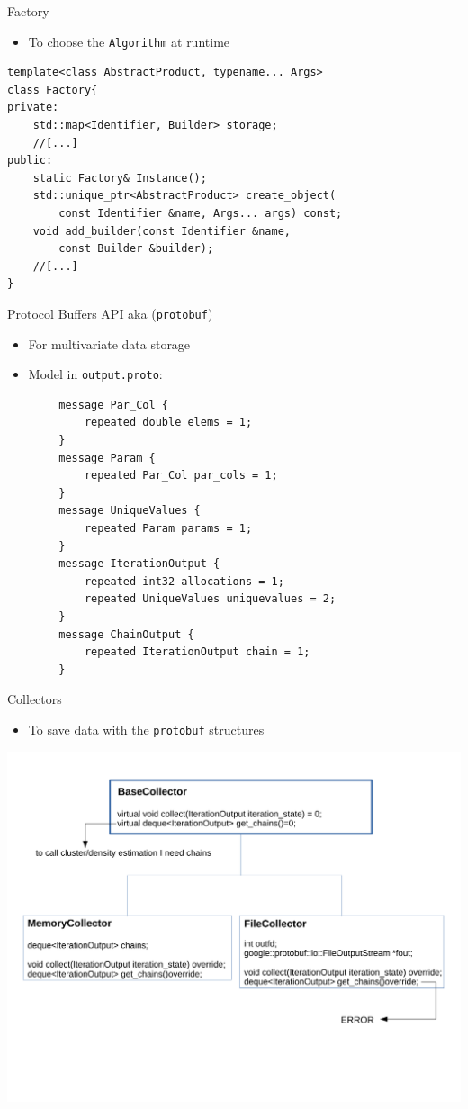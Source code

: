 \begin{frame}[fragile]{Factory}
\begin{itemize}
	\item To choose the \verb|Algorithm| at runtime
\end{itemize}

\begin{verbatim}
template<class AbstractProduct, typename... Args>
class Factory{
private:
    std::map<Identifier, Builder> storage;
    //[...]
public:
    static Factory& Instance();
    std::unique_ptr<AbstractProduct> create_object(
        const Identifier &name, Args... args) const;
    void add_builder(const Identifier &name,
        const Builder &builder);
    //[...]
}
\end{verbatim}
\end{frame}


\begin{frame}[fragile] {Protocol Buffers API aka (\texttt{protobuf})}
\begin{itemize}
	\item For multivariate data storage
	\item Model in \texttt{output.proto}:
\end{itemize}
\begin{small}
\begin{verbatim}
        message Par_Col {
            repeated double elems = 1;
        }
        message Param {
            repeated Par_Col par_cols = 1;
        }
        message UniqueValues {
            repeated Param params = 1;
        }
        message IterationOutput {
            repeated int32 allocations = 1;
            repeated UniqueValues uniquevalues = 2;
        }
        message ChainOutput {
            repeated IterationOutput chain = 1;
        }
\end{verbatim}
\end{small}
\end{frame}


\begin{frame}{Collectors}
\begin{itemize}
	\item To save data with the \texttt{protobuf} structures
\end{itemize}
	\begin{center}
		\includegraphics[scale=0.35]{etc/collectors.pdf}
	\end{center}
\end{frame}
